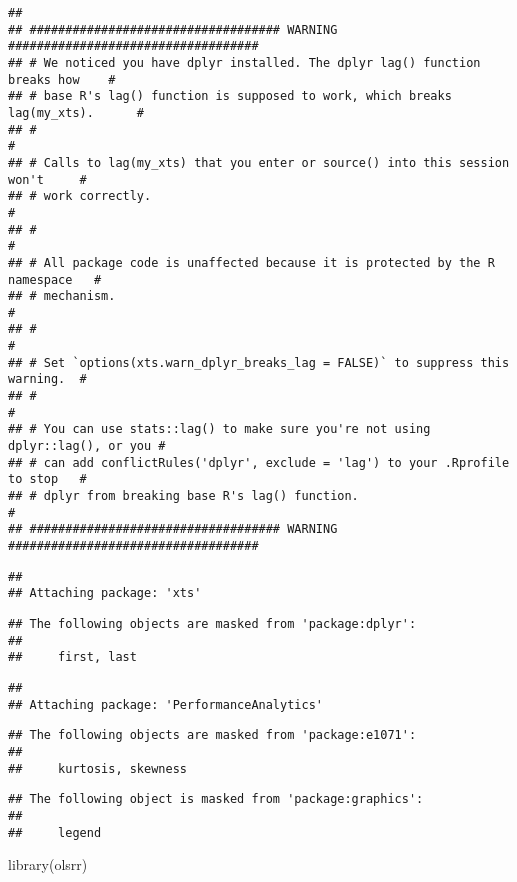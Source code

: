 \documentclass[
]{article}
\newenvironment{Shaded}{\begin{snugshade}}{\end{snugshade}}
\newcommand{\FunctionTok}[1]{\textcolor[rgb]{0.00,0.00,0.00}{#1}}
\newcommand{\NormalTok}[1]{#1}
\begin{document}
\begin{verbatim}
## 
## ################################### WARNING ###################################
## # We noticed you have dplyr installed. The dplyr lag() function breaks how    #
## # base R's lag() function is supposed to work, which breaks lag(my_xts).      #
## #                                                                             #
## # Calls to lag(my_xts) that you enter or source() into this session won't     #
## # work correctly.                                                             #
## #                                                                             #
## # All package code is unaffected because it is protected by the R namespace   #
## # mechanism.                                                                  #
## #                                                                             #
## # Set `options(xts.warn_dplyr_breaks_lag = FALSE)` to suppress this warning.  #
## #                                                                             #
## # You can use stats::lag() to make sure you're not using dplyr::lag(), or you #
## # can add conflictRules('dplyr', exclude = 'lag') to your .Rprofile to stop   #
## # dplyr from breaking base R's lag() function.                                #
## ################################### WARNING ###################################
\end{verbatim}

\begin{verbatim}
## 
## Attaching package: 'xts'
\end{verbatim}

\begin{verbatim}
## The following objects are masked from 'package:dplyr':
## 
##     first, last
\end{verbatim}

\begin{verbatim}
## 
## Attaching package: 'PerformanceAnalytics'
\end{verbatim}

\begin{verbatim}
## The following objects are masked from 'package:e1071':
## 
##     kurtosis, skewness
\end{verbatim}

\begin{verbatim}
## The following object is masked from 'package:graphics':
## 
##     legend
\end{verbatim}

\begin{Shaded}
\begin{Highlighting}[]
\FunctionTok{library}\NormalTok{(olsrr)}
\end{Highlighting}
\end{Shaded}
\end{document}
